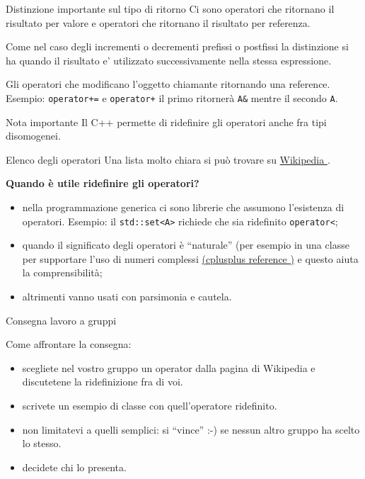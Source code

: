 \documentclass[xcolor={dvipsnames, svgnames, x11names, table}, 10pt]{beamer}
\begin{document}


\begin{frame}[fragile]{Distinzione importante sul tipo di ritorno}
Ci sono operatori che ritornano il risultato per valore e operatori che ritornano il risultato per referenza.

Come nel caso degli incrementi o decrementi prefissi o postfissi la distinzione si ha quando il risultato e’ utilizzato successivamente nella stessa espressione.

Gli operatori che modificano l'oggetto chiamante ritornando una reference.
Esempio: \texttt{operator+=} e \texttt{operator+} il primo ritornerà \texttt{A&} mentre il secondo \texttt{A}.

\begin{block}{Nota importante}
Il C++ permette di ridefinire gli operatori anche fra tipi disomogenei.
\end{block}
\end{frame}

\begin{frame}{Elenco degli operatori}
Una lista molto chiara si può trovare su \href{https://en.wikipedia.org/wiki/Operators\_in\_C\_and\_C\%2B\%2B}{Wikipedia \ExternalLink}.

\textbf{Quando è utile ridefinire gli operatori?}
\begin{itemize}[<+- | alert@+>]
    \item nella programmazione generica ci sono librerie che assumono l'esistenza di operatori. Esempio: il \texttt{std::set<A>} richiede che sia ridefinito \texttt{operator<};
    \item quando il significato degli operatori è \enquote{naturale} (per esempio in una classe per supportare l'uso di numeri complessi \href{https://www.cplusplus.com/reference/complex/complex/operators/}{(cplusplus reference \ExternalLink)} e questo aiuta la comprensibilità;
    \item altrimenti vanno usati con parsimonia e cautela.
\end{itemize}
\end{frame}

\begin{frame}{Consegna lavoro a gruppi}

Come affrontare la consegna:
\begin{itemize}
    \item scegliete nel vostro gruppo un operator dalla pagina di Wikipedia e discutetene la ridefinizione fra di voi.
    \item scrivete un esempio di classe con quell'operatore ridefinito.
    \item non limitatevi a quelli semplici: si \enquote{vince} :-) se nessun altro gruppo ha scelto lo stesso.
    \item decidete chi lo presenta.
\end{itemize}

\end{frame}
\end{document}
